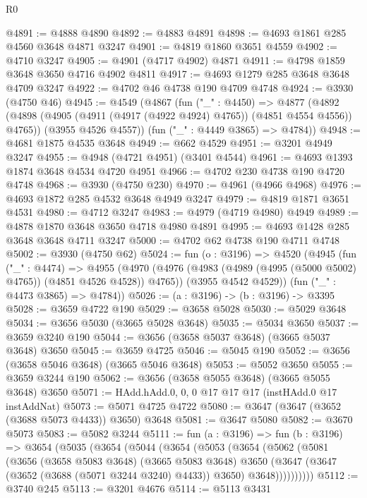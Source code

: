 \begin{lexlean}{R0}
\begin{coremodule}
@4891 := @4888 @4890
@4892 := @4883 @4891
@4898 := @4693 @1861 @285 @4560 @3648 @4871 @3247
@4901 := @4819 @1860 @3651 @4559
@4902 := @4710 @3247
@4905 := @4901 (@4717 @4902) @4871
@4911 := @4798 @1859 @3648 @3650 @4716 @4902 @4811
@4917 := @4693 @1279 @285 @3648 @3648 @4709 @3247
@4922 := @4702 @46 @4738 @190 @4709 @4748
@4924 := @3930 (@4750 @46)
@4945 := @4549
    (@4867
      (fun ("_" : @4450) =>
      @4877
        (@4892 (@4898 (@4905 (@4911 (@4917 (@4922 @4924) @4765)) (@4851 @4554 @4556)) @4765))
        (@3955 @4526 @4557))
      (fun ("_" : @4449 @3865) => @4784))
@4948 := @4681 @1875 @4535 @3648
@4949 := @662 @4529
@4951 := @3201 @4949 @3247
@4955 := @4948 (@4721 @4951) (@3401 @4544)
@4961 := @4693 @1393 @1874 @3648 @4534 @4720 @4951
@4966 := @4702 @230 @4738 @190 @4720 @4748
@4968 := @3930 (@4750 @230)
@4970 := @4961 (@4966 @4968)
@4976 := @4693 @1872 @285 @4532 @3648 @4949 @3247
@4979 := @4819 @1871 @3651 @4531
@4980 := @4712 @3247
@4983 := @4979 (@4719 @4980) @4949
@4989 := @4878 @1870 @3648 @3650 @4718 @4980 @4891
@4995 := @4693 @1428 @285 @3648 @3648 @4711 @3247
@5000 := @4702 @62 @4738 @190 @4711 @4748
@5002 := @3930 (@4750 @62)
@5024 := fun (o : @3196) =>
  @4520
    (@4945
      (fun ("_" : @4474) =>
      @4955
        (@4970 (@4976 (@4983 (@4989 (@4995 (@5000 @5002) @4765)) (@4851 @4526 @4528)) @4765))
        (@3955 @4542 @4529))
      (fun ("_" : @4473 @3865) => @4784))
@5026 := (a : @3196) -> (b : @3196) -> @3395
@5028 := @3659 @4722 @190
@5029 := @3658 @5028
@5030 := @5029 @3648
@5034 := @3656 @5030 (@3665 @5028 @3648)
@5035 := @5034 @3650
@5037 := @3659 @3240 @190
@5044 := @3656 (@3658 @5037 @3648) (@3665 @5037 @3648) @3650
@5045 := @3659 @4725
@5046 := @5045 @190
@5052 := @3656 (@3658 @5046 @3648) (@3665 @5046 @3648)
@5053 := @5052 @3650
@5055 := @3659 @3244 @190
@5062 := @3656 (@3658 @5055 @3648) (@3665 @5055 @3648) @3650
@5071 := HAdd.hAdd.{0, 0, 0} @17 @17 @17 (instHAdd.{0} @17 instAddNat)
@5073 := @5071 @4725 @4722
@5080 := @3647 (@3647 (@3652 (@3688 @5073 @4433)) @3650) @3648
@5081 := @3647 @5080
@5082 := @3670 @5073
@5083 := @5082 @3244
@5111 := fun (a : @3196) =>
  fun (b : @3196) =>
  @3654
    (@5035
      (@3654
        (@5044
          (@3654
            (@5053
              (@3654
                (@5062
                  (@5081
                    (@3656
                      (@3658 @5083 @3648)
                      (@3665 @5083 @3648)
                      @3650
                      (@3647 (@3647 (@3652 (@3688 (@5071 @3244 @3240) @4433)) @3650) @3648))))))))))
@5112 := @3740 @245
@5113 := @3201 @4676
@5114 := @5113 @3431

\end{coremodule}
\end{lexlean}
